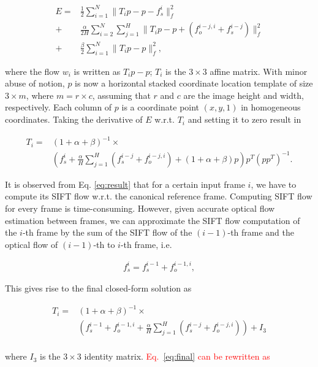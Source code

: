 \documentclass[10pt,journal]{IEEEtran}
\newcommand{\Songfan}[1]{\textcolor{red}{#1}}
\begin{document}
\begin{align}
	\label{data_affine}
E		=&\frac{1}{2}\sum_{i=1}^{N}\parallel{T_ip-p-f_s^i}\parallel_f^2
\\\label{smooth_affine}
				+&\frac{\alpha}{2H}\sum_{i=2}^{N}\sum_{j=1}^{H}\parallel{T_ip-p+(f_o^{i-j,i}+f_s^{i-j})}\parallel_f^2
\\\label{penalty_affine}
				+&\frac{\beta}{2}\sum_{i=1}^{N}\parallel{T_ip-p}\parallel_f^2,
\end{align} 

\noindent where the flow $w_i$ is written as $T_ip-p$; $T_i$ is the $3\times3$ affine matrix. With minor
 abuse of notion, $p$ is now a horizontal stacked coordinate location template of size $3\times m$, where $m=r\times c$, assuming that $r$ and $c$ are the image height and width, respectively. Each column of $p$ is a coordinate point $(x,y,1)$ in homogeneous coordinates. Taking the derivative of $E$ w.r.t. $T_i$ and setting it to zero result in 

\begin{align}
\label{eq:result}
T_i=&(1+\alpha+\beta)^{-1}\times \nonumber \\
		&(f_s^i+\frac{\alpha}{H}\sum_{j=1}^H(f_s^{i-j}+f_o^{i-j,i})+(1+\alpha+\beta)p)p^T(pp^T)^{-1}.
\end{align}

It is observed from Eq. \ref{eq:result} that for a certain input frame $i$, we have to compute its SIFT flow w.r.t. the canonical reference frame. Computing SIFT flow for every frame is time-consuming. However, given accurate optical flow estimation between frames, we can approximate the SIFT flow computation of the $i$-th frame by the sum of the SIFT flow of the $(i-1)$-th frame and the optical flow of $(i-1)$-th to $i$-th frame, i.e.

\begin{align}
\label{eq:approx}
f_s^i=f_s^{i-1}+f_o^{i-1,i},
\end{align}

This gives rise to the final closed-form solution as

\begin{align}
\label{eq:final}
T_i=&(1+\alpha+\beta)^{-1}\times \nonumber \\
		&(f_s^{i-1}+f_o^{i-1,i}+\frac{\alpha}{H}\sum_{j=1}^H(f_s^{i-j}+f_o^{i-j,i})) + I_3 \nonumber \\
\end{align}

\noindent where $I_3$ is the $3\times 3$ identity matrix. \Songfan{Eq.~\ref{eq:final} can be rewritten as}
\end{document}
